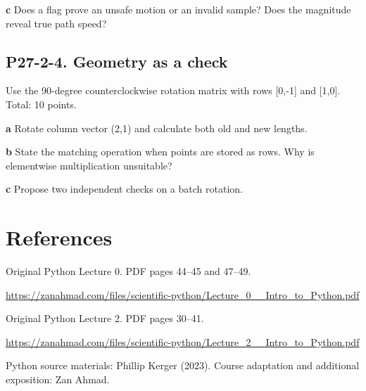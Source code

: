 \documentclass[11pt,letterpaper]{article}
\theoremstyle{definition}\newtheorem{definition}{Definition}\newtheorem{example}{Example}
\numberwithin{equation}{section}
\begin{document}
\textbf{c} Does a flag prove an unsafe motion or an invalid sample? Does the magnitude reveal true path speed?

\par\noindent\begin{minipage}{\linewidth}
\subsection*{P27-2-4. Geometry as a check}
Use the 90-degree counterclockwise rotation matrix with rows [0,-1] and [1,0]. Total: 10 points.

\textbf{a} Rotate column vector (2,1) and calculate both old and new lengths.

\end{minipage}\par\medskip
\textbf{b} State the matching operation when points are stored as rows. Why is elementwise multiplication unsuitable?

\textbf{c} Propose two independent checks on a batch rotation.

\section*{References}
\noindent\begin{minipage}{\linewidth}
Original Python Lecture 0. PDF pages 44--45 and 47--49.

\url{https://zanahmad.com/files/scientific-python/Lecture_0__Intro_to_Python.pdf}
\end{minipage}\par\medskip
\noindent\begin{minipage}{\linewidth}
Original Python Lecture 2. PDF pages 30--41.

\url{https://zanahmad.com/files/scientific-python/Lecture_2__Intro_to_Python.pdf}
\end{minipage}\par\medskip
Python source materials: Phillip Kerger (2023). Course adaptation and additional exposition: Zan Ahmad.
\end{document}
